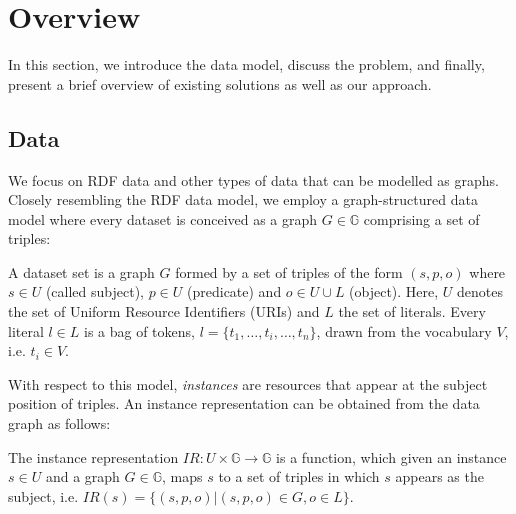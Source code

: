 \section{Overview}
In this section, we introduce the data model, discuss the problem, and finally, present a brief overview of existing solutions as well as our approach.


\subsection{Data} 

We focus on RDF data and other types of data that can be modelled as graphs. Closely resembling the RDF data model, we employ a graph-structured data model where every dataset is conceived as a graph $G \in\mathbb{G}$ comprising a set of triples: 

\begin{definition} A dataset set is a graph $G$ formed by a set of triples of the form $(s, p, o)$ where $s \in U$ (called subject), $p \in U$ (predicate) and $o \in U \cup L$ (object). Here, $U$ denotes the set of Uniform Resource Identifiers (URIs) and $L$ the set of literals. Every literal $l \in L$ is a bag of tokens, $l = \{t_1,\ldots,t_i,\ldots,t_n\}$, drawn from the vocabulary $V$, i.e. $t_i \in V$.  
\end{definition} 

With respect to this model, \emph{instances} are resources that appear at the subject position of triples. An instance representation can be obtained from the data graph as follows:

\begin{definition} The instance representation $IR: U \times \mathbb{G} \rightarrow \mathbb{G}$ is a function, which given an instance $s \in U$ and a graph $G \in \mathbb{G}$, maps $s$ to a set of triples in which $s$ appears as the subject, i.e. $IR(s) = \{ (s, p, o) | (s, p, o) \in G, o \in L \}$. 
\end{definition} 

